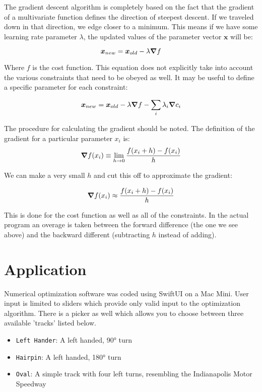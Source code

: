 \documentclass[12pt,twocolumn]{article}
\begin{document}
The gradient descent algorithm is completely based on the fact that the gradient of a multivariate function defines the direction of steepest descent. If we traveled down in that direction, we edge closer to a minimum. This means if we have some learning rate parameter $\lambda$, the updated values of the parameter vector $\bm{x}$ will be:

\begin{equation*}
  \bm{x}_{new}=\bm{x}_{old}-\lambda\grad{f}
\end{equation*}

Where $f$ is the cost function. This equation does not explicitly take into account the various constraints that need to be obeyed as well. It may be useful to define a specific parameter for each constraint:

\begin{equation}
  \bm{x}_{new}=\bm{x}_{old}-\lambda\grad{f}-\sum_i\lambda_i\grad{c_i}
\end{equation}

The procedure for calculating the gradient should be noted. The definition of the gradient for a particular parameter $x_i$ is:
\begin{align*}
  \grad{f(x_i)}\equiv\lim_{h\to0}\frac{f(x_i+h)-f(x_i)}{h}
\end{align*}

We can make a very small $h$ and cut this off to approximate the gradient:

\begin{align*}
  \grad{f(x_i)}\approx\frac{f(x_i+h)-f(x_i)}{h}
\end{align*}

This is done for the cost function as well as all of the constraints. In the actual program an overage is taken between the forward difference (the one we see above) and the backward different (subtracting $h$ instead of adding).
\section{Application}
Numerical optimization software was coded using SwiftUI on a Mac Mini. User input is limited to sliders which provide only valid input to the optimization algorithm. There is a picker as well which allows you to choose between three available 'tracks' listed below. 
\begin{itemize}
\item \verb+Left Hander+: A left handed, \ang{90} turn
\item \verb+Hairpin+: A left handed, \ang{180} turn
\item \verb+Oval+: A simple track with four left turns, resembling the Indianapolis Motor Speedway
\end{itemize}
\end{document}
